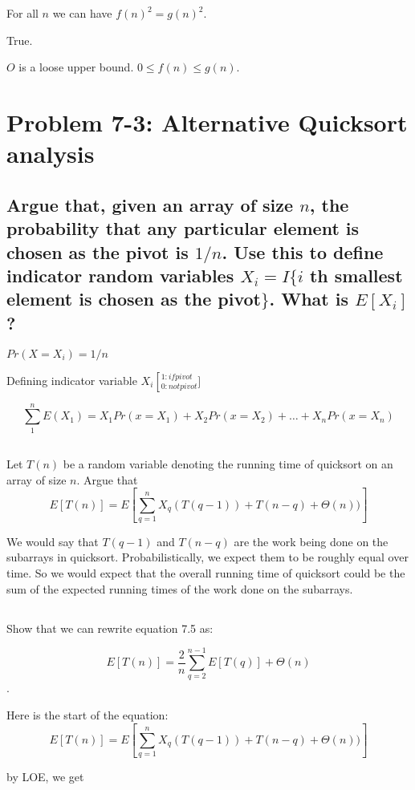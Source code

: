 \documentclass[titlepage]{article}\usepackage[]{graphicx}\usepackage[]{color}
\begin{document}
For all $n$ we can have $f(n)^2 = g(n)^2$.

True. 

$O$ is a loose upper bound. $0 \leq f(n) \leq g(n)$. 

\section{ Problem 7-3: Alternative Quicksort analysis}
\subsection{ 
Argue that, given an array of size $n$, the probability that any particular element
is chosen as the pivot is $1/n$. Use this to define indicator random variables
$X_i = I\{ i$ th smallest element is chosen as the pivot$\}$. What is
$E[X_i]$?}

$Pr(X=X_i) = 1/n$

Defining indicator variable $X_i \left[_{0: not pivot}^{1: if pivot}\right.]$

\[ \sum_{1}^{n} E(X_1) = X_1 Pr(x=X_1) + X_2Pr(x = X_2) + \dots + X_n
Pr(x=X_n) \]



\subsection{}
Let $T(n)$ be a random variable denoting the running time of quicksort on an
array of size $n$. Argue that \\
\[ E[T(n)] = E \left[ \sum_{q=1}^{n} X_q (T(q-1)) + T(n-q) + \Theta(n))\right] \]

We would say that $T(q-1)$ and $T(n-q)$ are the work being done on the
subarrays in quicksort. Probabilistically, we expect them to be roughly equal
over time. So we would expect that the overall running time of quicksort could
be the sum of the expected running times of the work done on the subarrays.


\subsection{}
Show that we can rewrite equation 7.5 as:

\[ E[T(n) ] = \frac{2}{n} \sum_{q=2}^{n-1} E[T(q)] + \Theta(n) \].


Here is the start of the equation:
\[ E[T(n)] = E \left[ \sum_{q=1}^{n} X_q (T(q-1)) + T(n-q) + \Theta(n))\right] \]

by LOE, we get
\end{document}
